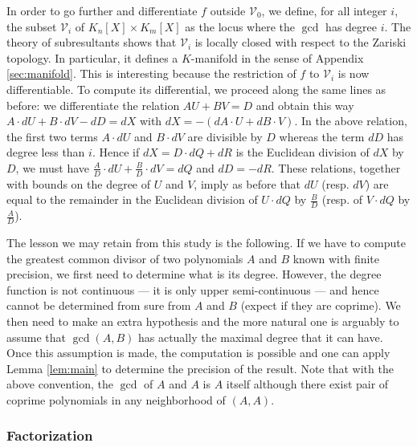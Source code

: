 \documentclass{lms}
\begin{document}
In order to go further and differentiate $f$ outside $\mathcal V_0$, we 
define, for all integer $i$, the subset $\mathcal V_i$ of $K_n[X] \times 
K_m[X]$ as the locus where the $\gcd$ has degree $i$. The theory of 
subresultants shows that $\mathcal V_i$ is locally closed with respect to 
the Zariski topology. In particular, it defines a $K$-manifold in the 
sense of Appendix \ref{sec:manifold}. This is interesting because the 
restriction of $f$ to $\mathcal V_i$ is now differentiable. To compute
its differential, we proceed along the same lines as before: we 
differentiate the relation $AU + BV = D$ and obtain this way
$A \cdot dU + B \cdot dV - dD = dX$
with $dX = - (dA \cdot U + dB \cdot V)$. In the above relation, the
first two terms $A{\cdot}dU$ and $B{\cdot}dV$ are divisible by $D$ 
whereas the term $dD$ has degree less than $i$. 
Hence if $dX = D \cdot dQ + dR$ is the Euclidean division of $dX$ by $D$, 
we must have $\frac A D \cdot dU + \frac B D \cdot dV = dQ$ and $dD = 
-dR$. These relations, together with bounds on the degree of $U$ and $V$,
imply as before that $dU$ (resp. $dV$) are equal to the remainder in the
Euclidean division of $U{\cdot}dQ$ by $\frac B D$ (resp. of $V{\cdot}dQ$
by $\frac A D$).

\medskip

The lesson we may retain from this study is the following. If we have to 
compute the greatest common divisor of two polynomials $A$ and $B$ known 
with finite precision, we first need to determine what is its degree. 
However, the degree function is not continuous --- it is only upper 
semi-continuous --- and hence cannot be determined from sure from $A$ and 
$B$ (expect if they are coprime). We then need to make an extra 
hypothesis and the more natural one is arguably to assume that 
$\gcd(A,B)$ has actually the maximal degree that it can have. Once this
assumption is made, the computation is possible and one can apply Lemma 
\ref{lem:main} to determine the precision of the result.
Note that with the above convention, the $\gcd$ of $A$ and $A$ is $A$ 
itself although there exist pair of coprime polynomials in any 
neighborhood of $(A,A)$.

\subsubsection*{Factorization}
\end{document}
